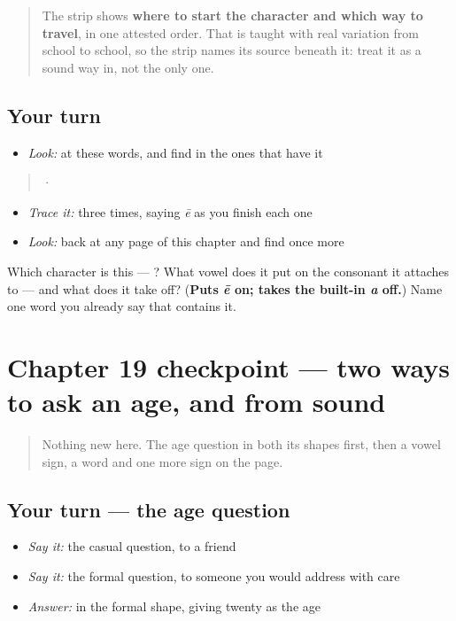 \begin{quote}
The strip shows \textbf{where to start the character and which way to travel}, in one attested order. That is taught with real variation from school to school, so the strip names its source beneath it: treat it as a sound way in, not the only one.
\end{quote}

\subsection*{Your turn}
\begin{itemize}
\raggedright
  \item \emph{Look:} at these words, and find  in the ones that have it
\end{itemize}

\begin{quote}
  ·  
\end{quote}

\begin{itemize}
\raggedright
  \item \emph{Trace it:}  three times, saying \emph{ē} as you finish each one
  \item \emph{Look:} back at any page of this chapter and find  once more
\end{itemize}

\begin{tcolorbox}[breakable,colback=teal!4,colframe=teal!35!black,title={Before you move on}]
Which character is this — ? What vowel does it put on the consonant it attaches to — and what does it take off? (\textbf{Puts \emph{ē} on; takes the built-in \emph{a} off.}) Name one word you already say that contains it.
\end{tcolorbox}
\section[Practice]{Chapter 19 checkpoint — two ways to ask an age, and  from sound}

\label{lesson:TA-C19-checkpoint}



\begin{quote}
Nothing new here. The age question in both its shapes first, then a vowel sign, a word and one more sign on the page.
\end{quote}

\subsection*{Your turn — the age question}
\begin{itemize}
\raggedright
  \item \emph{Say it:} the casual question, to a friend
  \item \emph{Say it:} the formal question, to someone you would address with care
  \item \emph{Answer:} in the formal shape, giving twenty as the age
\end{itemize}


